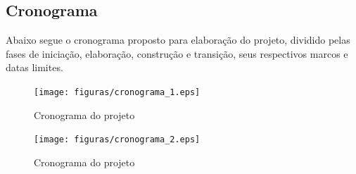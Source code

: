 \subsection{Cronograma}

Abaixo segue o cronograma proposto para elaboração do projeto, dividido pelas fases de iniciação, elaboração, construção e transição, seus respectivos marcos e datas limites.

\begin{figure}[H]
	\centering
	\texttt{[image: figuras/cronograma\_1.eps]}
	\caption{Cronograma do projeto} \label{cronograma_1}
\end{figure}

\begin{figure}[H]
	\centering
	\texttt{[image: figuras/cronograma\_2.eps]}
	\caption{Cronograma do projeto} \label{cronograma_2}
\end{figure}




